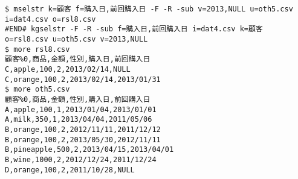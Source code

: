 \begin{Verbatim}[baselinestretch=0.7,frame=single]
$ mselstr k=顧客 f=購入日,前回購入日 -F -R -sub v=2013,NULL u=oth5.csv i=dat4.csv o=rsl8.csv
#END# kgselstr -F -R -sub f=購入日,前回購入日 i=dat4.csv k=顧客 o=rsl8.csv u=oth5.csv v=2013,NULL
$ more rsl8.csv
顧客%0,商品,金額,性別,購入日,前回購入日
C,apple,100,2,2013/02/14,NULL
C,orange,100,2,2013/02/14,2013/01/31
$ more oth5.csv
顧客%0,商品,金額,性別,購入日,前回購入日
A,apple,100,1,2013/01/04,2013/01/01
A,milk,350,1,2013/04/04,2011/05/06
B,orange,100,2,2012/11/11,2011/12/12
B,orange,100,2,2013/05/30,2012/11/11
B,pineapple,500,2,2013/04/15,2013/04/01
B,wine,1000,2,2012/12/24,2011/12/24
D,orange,100,2,2011/10/28,NULL
\end{Verbatim}
